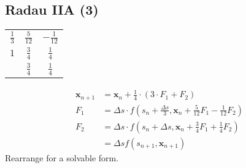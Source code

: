 \documentclass{article}
\begin{document}
\subsection{Radau IIA (3)}
\begin{center}
	\begin{tabular}{c|c c}
		$\frac{1}{3}$ & $\frac{5}{12}$ & $-\frac{1}{12}$ \\
		$1$           & $\frac{3}{4}$  & $\frac{1}{4}$   \\
		\hline
		              & $\frac{3}{4}$  & $\frac{1}{4}$
	\end{tabular}
\end{center}
\begin{align*}
	\bm{x}_{n+1} & = \bm{x}_n + \frac{1}{4}\cdot(3\cdot F_1 + F_2)                                                      \\
	F_1          & = \Delta s\cdot f\left(s_n + \frac{\Delta s}{3}, \bm{x}_n + \frac{5}{12}F_1 - \frac{1}{12}F_2\right) \\
	F_2          & = \Delta s\cdot f\left(s_n + \Delta s, \bm{x}_n + \frac{3}{4}F_1 + \frac{1}{4}F_2\right)             \\
	             & = \Delta s f\left(s_{n+1}, \bm{x}_{n+1}\right)
\end{align*}
Rearrange for a solvable form.
\end{document}
